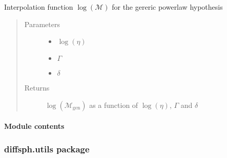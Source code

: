 \documentclass[letterpaper,10pt,english]{sphinxmanual}
\begin{document}
\begin{fulllineitems}
\label{\detokenize{diffsph.spectra:diffsph.spectra.synchrotron.lMst_pw}}
\sphinxAtStartPar
Interpolation function \(\log(\mathcal M)\) for the gereric power\sphinxhyphen{}law hypothesis
\begin{quote}\begin{description}
\item[{Parameters}] \leavevmode\begin{itemize}
\item {} 
\sphinxAtStartPar
{} \textendash{} \(\log(\eta)\)

\item {} 
\sphinxAtStartPar
{} \textendash{} \(\Gamma\)

\item {} 
\sphinxAtStartPar
{} \textendash{} \(\delta\)

\end{itemize}

\item[{Returns}] \leavevmode
\sphinxAtStartPar
\(\log(\mathcal M_\text{gen})\) as a function of \(\log(\eta)\), \(\Gamma\) and \(\delta\)

\end{description}\end{quote}

\end{fulllineitems}



\paragraph{Module contents}
\label{\detokenize{diffsph.spectra:module-diffsph.spectra}}\label{\detokenize{diffsph.spectra:module-contents}}

\subsubsection{diffsph.utils package}
\label{\detokenize{diffsph.utils:diffsph-utils-package}}\label{\detokenize{diffsph.utils::doc}}
\end{document}
